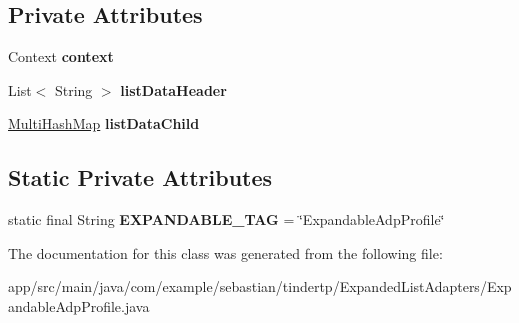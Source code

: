\subsection*{Private Attributes}
\begin{DoxyCompactItemize}
\item 
Context {\bfseries context}\hypertarget{classcom_1_1example_1_1sebastian_1_1tindertp_1_1ExpandedListAdapters_1_1ExpandableAdpProfile_af42baf91d4b41e68181d27cc93f3ef79}{}\label{classcom_1_1example_1_1sebastian_1_1tindertp_1_1ExpandedListAdapters_1_1ExpandableAdpProfile_af42baf91d4b41e68181d27cc93f3ef79}

\item 
List$<$ String $>$ {\bfseries list\+Data\+Header}\hypertarget{classcom_1_1example_1_1sebastian_1_1tindertp_1_1ExpandedListAdapters_1_1ExpandableAdpProfile_a489e886d8cafb5fbff0dac571f0884a5}{}\label{classcom_1_1example_1_1sebastian_1_1tindertp_1_1ExpandedListAdapters_1_1ExpandableAdpProfile_a489e886d8cafb5fbff0dac571f0884a5}

\item 
\hyperlink{classcom_1_1example_1_1sebastian_1_1tindertp_1_1commonTools_1_1MultiHashMap}{Multi\+Hash\+Map} {\bfseries list\+Data\+Child}\hypertarget{classcom_1_1example_1_1sebastian_1_1tindertp_1_1ExpandedListAdapters_1_1ExpandableAdpProfile_a5e7070ddb37f9858dfcb374a6885b179}{}\label{classcom_1_1example_1_1sebastian_1_1tindertp_1_1ExpandedListAdapters_1_1ExpandableAdpProfile_a5e7070ddb37f9858dfcb374a6885b179}

\end{DoxyCompactItemize}
\subsection*{Static Private Attributes}
\begin{DoxyCompactItemize}
\item 
static final String {\bfseries E\+X\+P\+A\+N\+D\+A\+B\+L\+E\+\_\+\+T\+AG} = \char`\"{}Expandable\+Adp\+Profile\char`\"{}\hypertarget{classcom_1_1example_1_1sebastian_1_1tindertp_1_1ExpandedListAdapters_1_1ExpandableAdpProfile_aaf9b9aae34098e29cf5a00f949135705}{}\label{classcom_1_1example_1_1sebastian_1_1tindertp_1_1ExpandedListAdapters_1_1ExpandableAdpProfile_aaf9b9aae34098e29cf5a00f949135705}

\end{DoxyCompactItemize}


The documentation for this class was generated from the following file\+:\begin{DoxyCompactItemize}
\item 
app/src/main/java/com/example/sebastian/tindertp/\+Expanded\+List\+Adapters/Expandable\+Adp\+Profile.\+java\end{DoxyCompactItemize}
